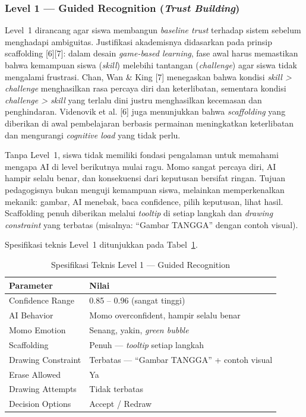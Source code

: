 \documentclass[10pt,twoside,openright]{report}
\begin{document}
\subsubsection{Level 1 --- Guided Recognition (\textit{Trust Building})}

Level~1 dirancang agar siswa membangun \textit{baseline trust} terhadap sistem sebelum menghadapi ambiguitas. Justifikasi akademisnya didasarkan pada prinsip scaffolding [6][7]: dalam desain \textit{game-based learning}, fase awal harus memastikan bahwa kemampuan siswa (\textit{skill}) melebihi tantangan (\textit{challenge}) agar siswa tidak mengalami frustrasi. Chan, Wan \& King [7] menegaskan bahwa kondisi \textit{skill > challenge} menghasilkan rasa percaya diri dan keterlibatan, sementara kondisi \textit{challenge > skill} yang terlalu dini justru menghasilkan kecemasan dan penghindaran. Videnovik et al. [6] juga menunjukkan bahwa \textit{scaffolding} yang diberikan di awal pembelajaran berbasis permainan meningkatkan keterlibatan dan mengurangi \textit{cognitive load} yang tidak perlu.

Tanpa Level~1, siswa tidak memiliki fondasi pengalaman untuk memahami mengapa AI di level berikutnya mulai ragu. Momo sangat percaya diri, AI hampir selalu benar, dan konsekuensi dari keputusan bersifat ringan. Tujuan pedagogisnya bukan menguji kemampuan siswa, melainkan memperkenalkan mekanik: gambar, AI menebak, baca confidence, pilih keputusan, lihat hasil. Scaffolding penuh diberikan melalui \textit{tooltip} di setiap langkah dan \textit{drawing constraint} yang terbatas (misalnya: ``Gambar TANGGA'' dengan contoh visual).

Spesifikasi teknis Level~1 ditunjukkan pada Tabel~\ref{tab:level1-spec}.

\begin{table}[H]
\centering
\caption{Spesifikasi Teknis Level 1 --- Guided Recognition}
\label{tab:level1-spec}
\begin{tabular}{|l|l|}
\hline
\textbf{Parameter} & \textbf{Nilai} \\ \hline
Confidence Range & 0.85 -- 0.96 (sangat tinggi) \\ \hline
AI Behavior & Momo overconfident, hampir selalu benar \\ \hline
Momo Emotion & Senang, yakin, \textit{green bubble} \\ \hline
Scaffolding & Penuh --- \textit{tooltip} setiap langkah \\ \hline
Drawing Constraint & Terbatas --- ``Gambar TANGGA'' + contoh visual \\ \hline
Erase Allowed & Ya \\ \hline
Drawing Attempts & Tidak terbatas \\ \hline
Decision Options & Accept / Redraw \\ \hline
\end{tabular}
\end{table}
\end{document}
